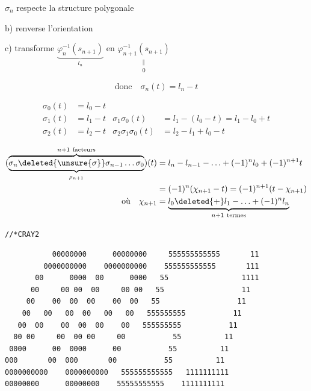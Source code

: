 

$\sigma_n$ \quad {} respecte la structure polygonale

b) renverse l'orientation

c) transforme $\underbrace{\varphi_n^{-1}(s_{n+1})}_{l_n}$ en $\underset{\substack{\Vert\\0}}{\varphi_{n+1}^{-1}(s_{n+1})}$

\[ \text{donc}\quad \sigma_n(t)=l_n-t \]

\[ \begin{aligned}
\sigma_0(t)&=l_0-t\\
\sigma_1(t)&=l_1-t &\sigma_1\sigma_0(t)&=l_1-(l_0-t)=l_1-l_0+t\\
\sigma_2(t)&=l_2-t &\sigma_2\sigma_1\sigma_0(t)&=l_2-l_1+l_0-t
\end{aligned} \]

\[ \begin{aligned}
(\underbrace{\overbrace{\sigma_n\deleted{\unsure{\sigma}}\sigma_{n-1}\ldots\sigma_0}^{n+1\ \text{facteurs}}}_{\rho_{n+1}})(t)&=l_n-l_{n-1}-\ldots+(-1)^n l_0+(-1)^{n+1}t\\
&=(-1)^n(\chi_{n+1}-t)=(-1)^{n+1}(t-\chi_{n+1})\\
\text{où}\quad \chi_{n+1}&=\underbrace{l_0\deleted{+}l_1-\ldots+(-1)^n l_n}_{n+1\ \text{termes}}
\end{aligned} \]


\texttt{//*\quad CRAY2\qquad {}}

{\scriptsize
\begin{verbatim}
           00000000      00000000     555555555555       11
         0000000000    0000000000    555555555555       111
       00      0000  00      0000   55                 1111
      00     00 00  00     00 00   55                  11
     00    00  00  00    00  00   55                  11
    00   00   00  00   00   00   555555555           11
   00  00    00  00  00    00   555555555           11
  00 00     00  00 00     00           55          11
 0000      00  0000      00           55          11
000       00  000       00           55          11
0000000000    0000000000   555555555555   1111111111
00000000      00000000    55555555555    1111111111
\end{verbatim}
}

